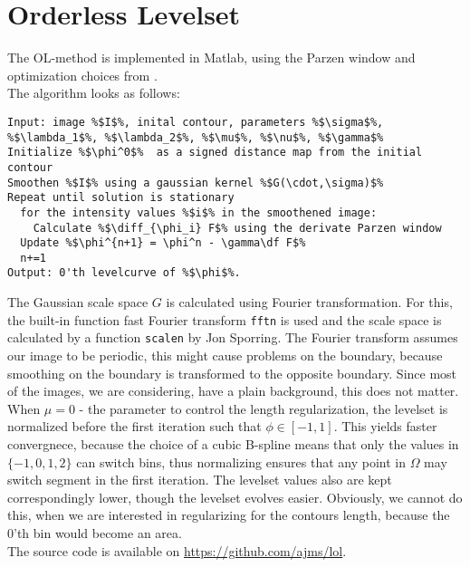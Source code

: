 \section{Orderless Levelset}
The OL-method is implemented in Matlab, using the Parzen window and optimization choices from .\\
The algorithm looks as follows:\\

\begin{lstlisting}
Input: image %$I$%, inital contour, parameters %$\sigma$%, %$\lambda_1$%, %$\lambda_2$%, %$\mu$%, %$\nu$%, %$\gamma$%
Initialize %$\phi^0$%  as a signed distance map from the initial contour
Smoothen %$I$% using a gaussian kernel %$G(\cdot,\sigma)$%
Repeat until solution is stationary
  for the intensity values %$i$% in the smoothened image:
    Calculate %$\diff_{\phi_i} F$% using the derivate Parzen window
  Update %$\phi^{n+1} = \phi^n - \gamma\df F$%
  n+=1
Output: 0'th levelcurve of %$\phi$%.
\end{lstlisting} 

The Gaussian scale space $G$ is calculated using Fourier transformation. For this, the built-in function fast Fourier transform \texttt{fftn} is used and the scale space is calculated by a function \texttt{scalen} by Jon Sporring. The Fourier transform assumes our image to be periodic, this might cause problems on the boundary, because smoothing on the boundary is transformed to the opposite boundary. Since most of the images, we are considering, have a plain background, this does not matter.\\
When $\mu=0$ - the parameter to control the length regularization, the levelset is normalized before the first iteration such that $\phi\in [-1,1]$. This yields faster convergnece, because the choice of a cubic B-spline means that only the values in $\{-1,0,1,2\}$ can switch bins, thus normalizing ensures that any point in $\Omega$ may switch segment in the first iteration. The levelset values also are kept correspondingly lower, though the levelset evolves easier. Obviously, we cannot do this, when we are interested in regularizing for the contours length, because the 0'th bin would become an area.\\
The source code is available on \href{https://github.com/ajms/lol}{https://github.com/ajms/lol}.